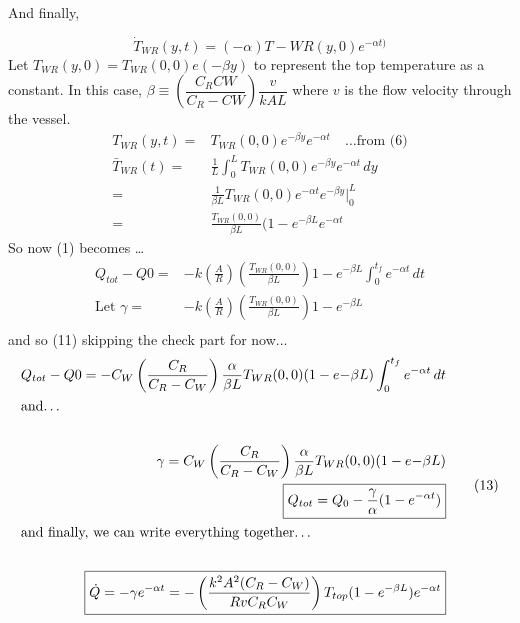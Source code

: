 \documentclass[a4paper,10pt]{scrbook}
\begin{document}
And finally,

\begin{equation*}
\boxed{\dot{T}_{WR}(y,t)=(-\alpha)T-{WR}(y,0)e^{-\alpha t)}}\tag{8}
\end{equation*}
\pagebreak
\vspace{0.5cm}\linebreak
Let $T_{WR}(y,0)=T_{WR}(0,0)e(-\beta y)$ to represent the top temperature as a constant.
\vspace{0.5cm}\linebreak
In this case, $\beta \equiv \left(\dfrac{C_{R}C{W}}{C_{R}-C{W}}\right)\dfrac{v}{kAL}$ where $v$ is the flow velocity through the vessel. 
\begin{equation*}
\begin{split}
T_{WR}(y,t)=&T_{WR}(0,0)e^{-\beta y}e^{-\alpha t} \quad\text{\ldots from (6)}\\
\bar{T}_{WR}(t)=&\frac{1}{L}\int_{0}^{L}T_{WR}(0,0)e^{-\beta y}e^{-\alpha t}\,dy\\
=&\frac{1}{\beta L}T_{WR}(0,0)e^{-\alpha t}e^{-\beta y}\vert_{0}^{L}\\
=&\frac{T_{WR}(0,0)}{\beta L}(1-e^{-\beta L}e^{-\alpha t}
\end{split}
\end{equation*}
\vspace{0.5cm}
So now (1) becomes \ldots
\begin{equation*}
\begin{split}
Q_{tot}-Q{0}=&-k\left(\frac{A}{R}\right)\left(\frac{T_{WR}(0,0)}{\beta L}\right)1-e^{-\beta L} \int_{0}^{t_{f}}e^{-\alpha t}\,dt\\
\text{Let }\gamma =&-k\left(\frac{A}{R}\right)\left(\frac{T_{WR}(0,0)}{\beta L}\right)1-e^{-\beta L}\\
\end{split}
\end{equation*}
and so  \centering{}     (11)
\vspace{2cm}\linebreak
skipping the check part for now...\linebreak
\vspace{2cm}\linebreak
\begin{equation*}
\begin{split}
Q_{tot}-Q{0}=-C_{W}\left(\frac{C_{R}}{C_{R}-C_{W}}\right)\dfrac{\alpha}{\beta L} T_{WR}(0,0)(1-e{-\beta L})\int_{0}^{t_{f}}e^{-\alpha t}\,dt\\
\intertext{and\ldots}\\
\gamma=C_{W}\left(\frac{C_{R}}{C_{R}-C_{W}}\right)\dfrac{\alpha}{\beta L} T_{WR}(0,0)(1-e{-\beta L})\\
\boxed{Q_{tot}=Q_{0}-\frac{\gamma}{\alpha}(1-e^{-\alpha t})}\\
\intertext{and finally, we can write everything together\ldots}\\
\boxed{\dot{Q}=-\gamma e^{-\alpha t}=-\left(\frac{k^{2}A^{2}(C_{R}-C_{W})}{RvC_{R}C_{W}}\right)T_{top}(1-e^{-\beta L})e^{-\alpha t}}
\end{split}\tag{13}
\end{equation*}
\end{document}
